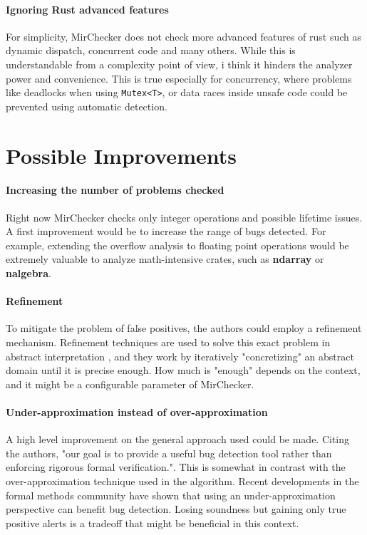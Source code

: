 \documentclass{article}
\begin{document}
\paragraph{Ignoring Rust advanced features}
For simplicity, MirChecker does not check more advanced features of rust such as dynamic dispatch, concurrent code and many others. While 
this is understandable from a complexity point of view, i think it hinders the analyzer power and convenience. This is true especially for concurrency, 
where problems like deadlocks when using \texttt{Mutex<T>}, or data races inside unsafe code could be prevented 
using automatic detection.

\section{Possible Improvements}

\paragraph{Increasing the number of problems checked}
Right now MirChecker checks only integer operations and possible lifetime issues. 
A first improvement would be to increase the range  of bugs detected. For example, extending the overflow 
analysis to floating point operations would be extremely valuable 
to analyze math-intensive crates, such as \textbf{ndarray} or \textbf{nalgebra}.

\paragraph{Refinement}
To mitigate the problem of false positives, the authors could employ a refinement mechanism. Refinement techniques are used to solve 
this exact problem in abstract interpretation \cite{gulavani2006counterexample}\cite{bogomolov2017counterexample}, and they work by iteratively "concretizing" an abstract domain  until it is precise enough. 
How much is "enough" depends on the context, and it might be a configurable parameter of MirChecker.
\paragraph{Under-approximation instead of over-approximation}
A high level improvement  on the general approach used could be made. Citing the authors, "our goal is to provide a useful bug detection tool rather
than enforcing rigorous formal verification.". This is somewhat in contrast with the over-approximation technique used in the algorithm. Recent developments 
in the formal methods community \cite{o2019incorrectness}\cite{murray2021incremental}\cite{le2022finding} have shown that using an under-approximation perspective can benefit bug detection. Losing soundness but gaining only true positive  alerts 
is a tradeoff that might be beneficial in this context.


\end{document}
